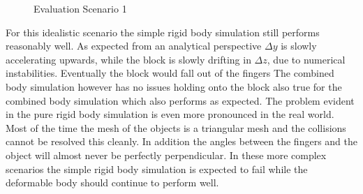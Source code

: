 \begin{figure}[htb]
	\setcounter{subfigure}{0}
	\centering
	\setcounter{subfigure}{0}
	\caption{Evaluation Scenario 1}
\end{figure}

For this idealistic scenario the simple rigid body simulation still performs reasonably well. As expected from an analytical perspective $\Delta y$ is slowly accelerating upwards, while the block is slowly drifting in $\Delta z$, due to numerical instabilities. Eventually the block would fall out of the fingers The combined body simulation however has no issues holding onto the block also true for the combined body simulation which also performs as expected. The problem evident in the pure rigid body simulation is even more pronounced in the real world. Most of the time the mesh of the objects is a triangular mesh and the collisions cannot be resolved this cleanly. In addition the angles between the fingers and the object will almost never be perfectly perpendicular. In these more complex scenarios the simple rigid body simulation is expected to fail while the deformable body should continue to perform well.


